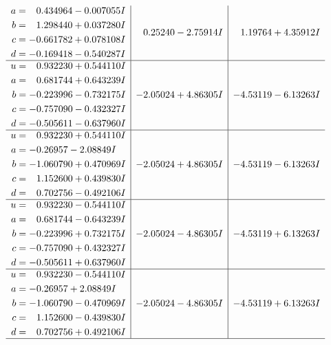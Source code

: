 \documentclass[1p]{elsarticle_modified}
\theoremstyle{definition}
\begin{document}
$$\begin{array}{c|c|c}
\begin{aligned}
a &= \phantom{-}0.434964 - 0.007055 I \\
b &= \phantom{-}1.298440 + 0.037280 I \\
c &= -0.661782 + 0.078108 I \\
d &= -0.169418 - 0.540287 I\end{aligned}
 & \phantom{-}0.25240 - 2.75914 I & \phantom{-}1.19764 + 4.35912 I \\ \hline\begin{aligned}
u &= \phantom{-}0.932230 + 0.544110 I \\
a &= \phantom{-}0.681744 + 0.643239 I \\
b &= -0.223996 - 0.732175 I \\
c &= -0.757090 - 0.432327 I \\
d &= -0.505611 - 0.637960 I\end{aligned}
 & -2.05024 + 4.86305 I & -4.53119 - 6.13263 I \\ \hline\begin{aligned}
u &= \phantom{-}0.932230 + 0.544110 I \\
a &= -0.26957 - 2.08849 I \\
b &= -1.060790 + 0.470969 I \\
c &= \phantom{-}1.152600 + 0.439830 I \\
d &= \phantom{-}0.702756 - 0.492106 I\end{aligned}
 & -2.05024 + 4.86305 I & -4.53119 - 6.13263 I \\ \hline\begin{aligned}
u &= \phantom{-}0.932230 - 0.544110 I \\
a &= \phantom{-}0.681744 - 0.643239 I \\
b &= -0.223996 + 0.732175 I \\
c &= -0.757090 + 0.432327 I \\
d &= -0.505611 + 0.637960 I\end{aligned}
 & -2.05024 - 4.86305 I & -4.53119 + 6.13263 I \\ \hline\begin{aligned}
u &= \phantom{-}0.932230 - 0.544110 I \\
a &= -0.26957 + 2.08849 I \\
b &= -1.060790 - 0.470969 I \\
c &= \phantom{-}1.152600 - 0.439830 I \\
d &= \phantom{-}0.702756 + 0.492106 I\end{aligned}
 & -2.05024 - 4.86305 I & -4.53119 + 6.13263 I\\
 \hline 
 \end{array}$$\newpage$$\begin{array}{c|c|c}  

\end{array}$$
\end{document}
